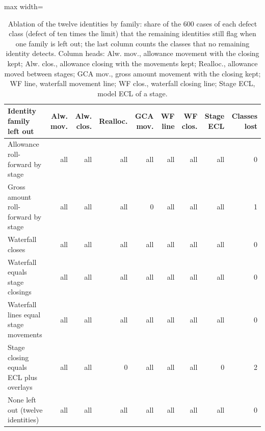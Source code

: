 \begin{table}[htbp]
\centering
\small
\caption{Ablation of the twelve identities by family: share of the 600 cases of each defect class (defect of ten times the limit) that the remaining identities still flag when one family is left out; the last column counts the classes that no remaining identity detects. Column heads: Alw. mov., allowance movement with the closing kept; Alw. clos., allowance closing with the movements kept; Realloc., allowance moved between stages; GCA mov., gross amount movement with the closing kept; WF line, waterfall movement line; WF clos., waterfall closing line; Stage ECL, model ECL of a stage.}
\label{tab:ablation}
\begin{adjustbox}{max width=\textwidth}
\begin{tabular}{p{4.6cm}rrrrrrrr}
\toprule
Identity family left out & Alw. mov. & Alw. clos. & Realloc. & GCA mov. & WF line & WF clos. & Stage ECL & Classes lost \\
\midrule
Allowance roll-forward by stage & all & all & all & all & all & all & all & 0 \\
Gross amount roll-forward by stage & all & all & all & 0 & all & all & all & 1 \\
Waterfall closes & all & all & all & all & all & all & all & 0 \\
Waterfall equals stage closings & all & all & all & all & all & all & all & 0 \\
Waterfall lines equal stage movements & all & all & all & all & all & all & all & 0 \\
Stage closing equals ECL plus overlays & all & all & 0 & all & all & all & 0 & 2 \\
None left out (twelve identities) & all & all & all & all & all & all & all & 0 \\
\bottomrule
\end{tabular}
\end{adjustbox}
\end{table}
